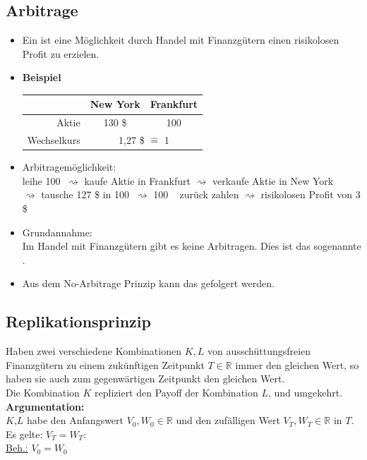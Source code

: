 \subsection{Arbitrage} %
\label{sub:arbitrage}
\begin{itemize}
	\item Ein  ist eine Möglichkeit durch Handel mit Finanzgütern einen risikolosen Profit zu erzielen.
	\item \textbf{Beispiel} \\
	\begin{tabular}{r | c c}
		& New York & Frankfurt \\
		\hline
		Aktie & 130 \$ & 100 \texteuro \\
		Wechselkurs & \multicolumn{2}{c}{1,27 \$ $\mathrel{\hat=}$ 1 \texteuro } \\
	\end{tabular}
	\item Arbitragemöglichkeit: \\
	leihe 100 \texteuro $~\rightsquigarrow$ kaufe Aktie in Frankfurt $\rightsquigarrow$ verkaufe Aktie in New York\\ $\rightsquigarrow$ tausche 127 \$ in 100 \texteuro  $~\rightsquigarrow$ 100 \texteuro~  zurück zahlen $\rightsquigarrow$ risikolosen Profit von 3 \$
	\item Grundannahme: \\
	Im Handel mit Finanzgütern gibt es keine Arbitragen. Dies ist das sogenannte . 
	\item Aus dem No-Arbitrage Prinzip kann das  gefolgert werden.	
\end{itemize}

\subsection{Replikationsprinzip}
\label{sub: replikationsprinzip}
Haben zwei verschiedene Kombinationen $K,L$ von ausschüttungsfreien Finanzgütern zu einem zukünftigen Zeitpunkt $T \in \mathds{R}$ immer den gleichen Wert, so haben sie auch zum gegenwärtigen Zeitpunkt den gleichen Wert. \\
Die Kombination $K$ repliziert den Payoff der Kombination $L$, und umgekehrt.\\
\textbf{Argumentation:}\\
$K$,$L$ habe den Anfangswert $V_0,W_0 \in \mathds{R}$ und den zufälligen Wert $V_T,W_T \in \mathds{R}$ in $T$. \\
Es gelte: $V_T = W_T$: \\
\underline{Beh.:} $V_0 = W_0$ \\

